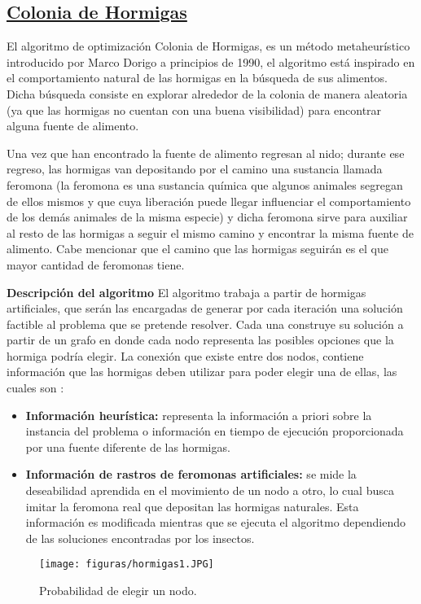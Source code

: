 \documentclass[10pt,conference]{IEEEtran}
\begin{document}
\subsection{\underline{\textbf{Colonia de Hormigas}}}
El algoritmo de optimización Colonia de Hormigas, es un método metaheurístico introducido por Marco Dorigo a principios de 1990, el algoritmo está inspirado en el comportamiento natural de las hormigas en la búsqueda de sus alimentos. Dicha búsqueda consiste en explorar alrededor de la colonia de manera aleatoria (ya que las hormigas no cuentan con una buena visibilidad) para encontrar alguna fuente de alimento.\citep{dorigo} \par Una vez que han encontrado la fuente de alimento regresan al nido; durante ese regreso, las hormigas van depositando por el camino una sustancia llamada feromona (la feromona es una sustancia química que algunos animales segregan de ellos mismos y que cuya liberación puede llegar influenciar el comportamiento de los demás animales de la misma especie) y dicha feromona sirve para auxiliar al resto de las hormigas a seguir el mismo camino y encontrar la misma fuente de alimento. Cabe mencionar que el camino que las hormigas seguirán es el que mayor cantidad de feromonas tiene. \par
\textbf{Descripción del algoritmo}
    El algoritmo trabaja a partir de hormigas artificiales, que serán las encargadas de generar por cada iteración una solución factible al problema que se pretende resolver. Cada una construye su solución a partir de un grafo en donde cada nodo representa las posibles opciones que la hormiga podría elegir. La conexión que existe entre dos nodos, contiene información que las hormigas deben utilizar para poder elegir una de ellas, las cuales son \citep{dorigo}:
    \begin{itemize}
        \item \textbf{Información heurística:} representa la información a priori sobre la instancia del problema o información en tiempo de ejecución proporcionada por una fuente diferente de las hormigas.
        \item \textbf{Información de rastros de feromonas artificiales:} se mide la deseabilidad aprendida en el movimiento de un nodo a otro, lo cual busca imitar la feromona real que depositan las hormigas naturales. Esta información es modificada mientras que se ejecuta el algoritmo dependiendo de las soluciones encontradas por los insectos. 
    \end{itemize}
\begin{figure}[H]
 \begin{center}
       \texttt{[image: figuras/hormigas1.JPG]}
      \caption{Probabilidad de elegir un nodo.}
      \label{f4hormiga} 
      \end{center}
\end{figure}
\end{document}
